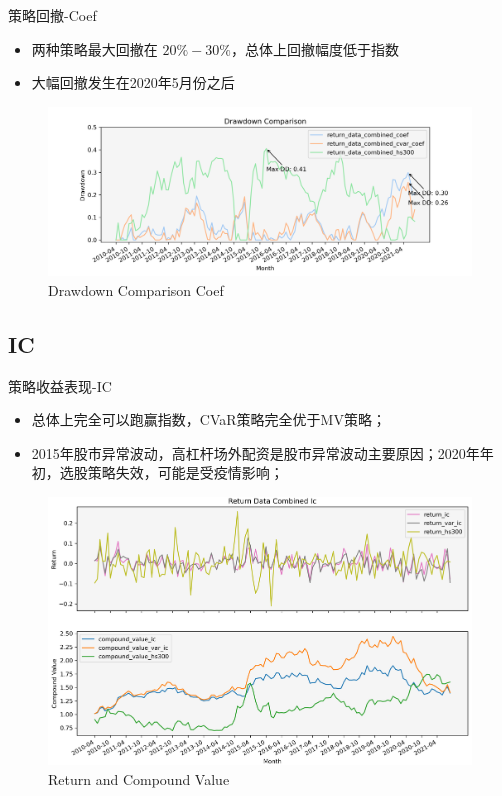 \documentclass[CJK,aspectratio=43]{beamer}  %
\begin{document}
\begin{frame}{策略回撤-Coef}
	\begin{itemize}
		\item 两种策略最大回撤在 $20\%-30\%$，总体上回撤幅度低于指数
		\item 大幅回撤发生在2020年5月份之后
	\end{itemize}
	\begin{figure}
		\centering
		\includegraphics[width=1\linewidth]{"pic/Drawdown_Comparison_Coef"}
		\caption{Drawdown Comparison Coef}
		\label{fig:coefdramdown}
	\end{figure}
\end{frame}

\subsection{IC}
\begin{frame}{策略收益表现-IC}
	\begin{itemize}
		\item 总体上完全可以跑赢指数，CVaR策略完全优于MV策略；
		\item 2015年股市异常波动，高杠杆场外配资是股市异常波动主要原因；2020年年初，选股策略失效，可能是受疫情影响；
	\end{itemize}
	\begin{figure}
		\centering
		\includegraphics[width=0.79\linewidth]{pic/IC}
		\caption{Return and Compound Value}
		\label{fig:ic}
	\end{figure}
\end{frame}
\end{document}
